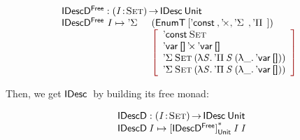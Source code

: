 \[\stk{
\IDescFreeD : \PI{\V{I}}{\Set} \IDesc{\Unit} \\
\begin{array}{@{}ll}
\IDescFreeD~I \mapsto \DSigma{}{} & (\EnumT \red{[} \DConst{},
                                              \DProd{}{},
                                              \DSigma{}{}, 
                                              \DPi{}{} \red{]}) \\
                                  & \bigRedBracket{\begin{array}{l}
                                        \DConst{\Set}               \\
                                        \DProd{\DVar{\Void}}{\DVar{\Void}}  \\
                                        \DSigma{\Set}{(\LAM{\V{S}} \DPi{\V{S}}{(\LAM{\_} \DVar{\Void})})} \\
                                        \DSigma{\Set}{(\LAM{\V{S}} \DPi{\V{S}}{(\LAM{\_} \DVar{\Void})})}
                                    \end{array}}
\end{array}
}\]

Then, we get $\IDesc$ by building its free monad:

\[\stk{
\IDescD : \PI{\V{I}}{\Set} \IDesc{\Unit} \\
\IDescD\: \V{I} \mapsto \FreeIMonad{\red{[}\IDescFreeD\red{]}}{\Unit}{\V{I}}\: \V{I}
}\]


